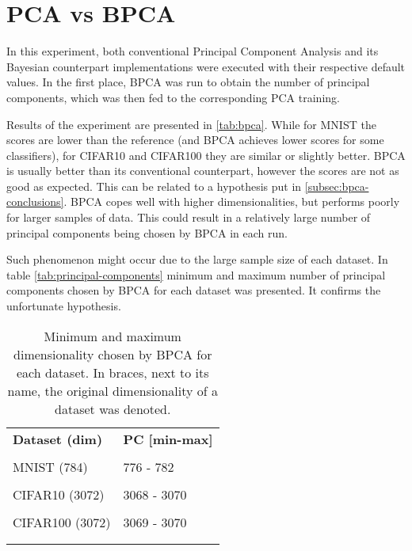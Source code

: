 \section{PCA vs BPCA}
In this experiment, both conventional Principal Component Analysis and its Bayesian counterpart implementations were executed with their respective default values. In the first place, BPCA was run to obtain the number of principal components, which was then fed to the corresponding PCA training.



Results of the experiment are presented in \autoref{tab:bpca}. While for MNIST the scores are lower than the reference (and BPCA achieves lower scores for some classifiers), for CIFAR10 and CIFAR100 they are similar or slightly better. BPCA is usually better than its conventional counterpart, however the scores are not as good as expected. This can be related to a hypothesis put in \autoref{subsec:bpca-conclusions}. BPCA copes well with higher dimensionalities, but performs poorly for larger samples of data. This could result in a relatively large number of principal components being chosen by BPCA in each run. 

\vspace{\baselineskip}
Such phenomenon might occur due to the large sample size of each dataset. In table \autoref{tab:principal-components} minimum and maximum number of principal components chosen by BPCA for each dataset was presented. It confirms the unfortunate hypothesis.

\begin{table}[]
    \centering
    \footnotesize
    \begin{tabular}{ll}\n\toprule\n \textbf{Dataset (dim)} &          \textbf{PC [min-max]} \\\\\n\midrule\n    
    MNIST (784) & 776 - 782 \\\\\n  
    CIFAR10 (3072) & 3068 - 3070 \\\\\n  
    CIFAR100 (3072) & 3069 - 3070 \\\\\n  
    \bottomrule\n
    \end{tabular}
    \caption[Dimensionality chosen by BPCA for each dataset]{Minimum and maximum dimensionality chosen by BPCA for each dataset. In braces, next to its name, the original dimensionality of a dataset was denoted.}
    \label{tab:principal-components}
\end{table}